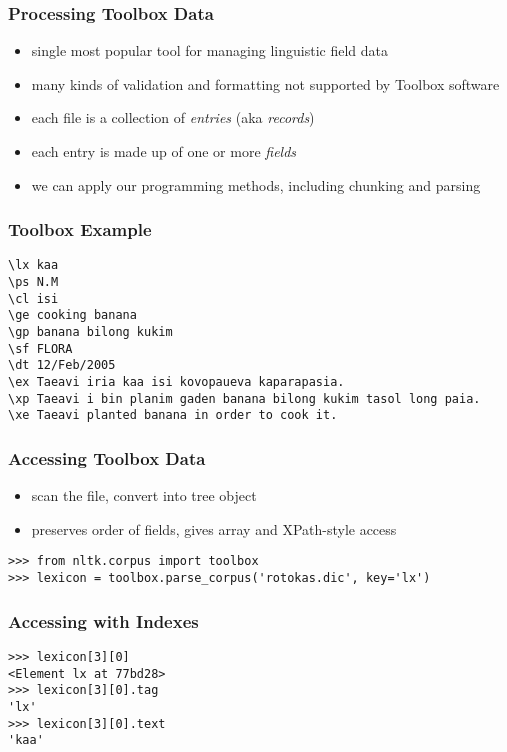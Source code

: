 \documentclass{beamer}             %
\begin{document}
\begin{frame}
\frametitle{Processing Toolbox Data}

\begin{itemize}
\item single most popular tool for managing linguistic field data
\item many kinds of validation and formatting not supported by Toolbox software
\item each file is a collection of \textit{entries} (aka
  \textit{records})
\item each entry is made up of one or more \textit{fields}
\item we can apply our programming methods, including chunking and parsing
\end{itemize}
\end{frame}

\begin{frame}[fragile]
\frametitle{Toolbox Example}
\small

\begin{verbatim}
\lx kaa
\ps N.M
\cl isi
\ge cooking banana
\gp banana bilong kukim
\sf FLORA
\dt 12/Feb/2005
\ex Taeavi iria kaa isi kovopaueva kaparapasia.
\xp Taeavi i bin planim gaden banana bilong kukim tasol long paia.
\xe Taeavi planted banana in order to cook it.
\end{verbatim}
\end{frame}

\begin{frame}[fragile]
\frametitle{Accessing Toolbox Data}

\begin{itemize}
\item scan the file, convert into tree object
\item preserves order of fields, gives array and XPath-style access
\end{itemize}

\scriptsize
\begin{verbatim}
>>> from nltk.corpus import toolbox
>>> lexicon = toolbox.parse_corpus('rotokas.dic', key='lx')
\end{verbatim}
\end{frame}

\begin{frame}[fragile]
\frametitle{Accessing with Indexes}

\begin{verbatim}
>>> lexicon[3][0] 
<Element lx at 77bd28>
>>> lexicon[3][0].tag
'lx'
>>> lexicon[3][0].text
'kaa'
\end{verbatim}
\end{frame}
\end{document}
